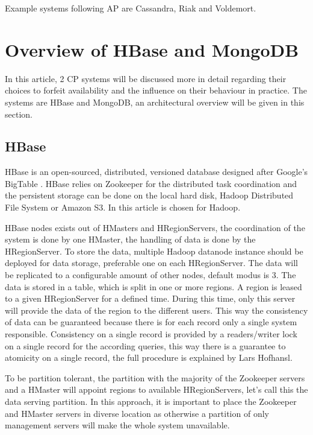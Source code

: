 \documentclass[final,5p,times]{elsarticle}
\begin{document}
Example systems following AP are Cassandra, Riak and Voldemort. 

\section{Overview of HBase and MongoDB}\label{sec:hbaseandmongodb}
In this article, 2 CP systems will be discussed more in detail regarding their choices to forfeit availability and the influence on their behaviour in practice. The systems are HBase and MongoDB, an architectural overview will be given in this section. 

\subsection{HBase}
HBase\cite{hbase-doc} is an open-sourced, distributed, versioned database designed after Google's BigTable \cite{chang2008bigtable}. HBase relies on Zookeeper for the distributed task coordination and the persistent storage can be done on the local hard disk, Hadoop Distributed File System or Amazon S3. In this article is chosen for Hadoop. 

HBase nodes exists out of HMasters and HRegionServers, the coordination of the system is done by one HMaster, the handling of data is done by the HRegionServer. To store the data, multiple Hadoop datanode instance should be deployed for data storage, preferable one on each HRegionServer. The data will be replicated to a configurable amount of other nodes, default modus is 3. The data is stored in a table, which is split in one or more regions. A region is leased to a given HRegionServer for a defined time. During this time, only this server will provide the data of the region to the different users. This way the consistency of data can be guaranteed because there is for each record only a single system responsible. Consistency on a single record is provided by a readers/writer lock on a single record for the according queries, this way there is a guarantee to atomicity on a single record, the full procedure is explained by Lars Hofhansl\cite{hbase-acid}. 

To be partition tolerant, the partition with the majority of the Zookeeper servers and a HMaster will appoint regions to available HRegionServers, let's call this the data serving partition. In this approach, it is important to place the Zookeeper and HMaster servers in diverse location as otherwise a partition of only management servers will make the whole system unavailable. 
\end{document}
